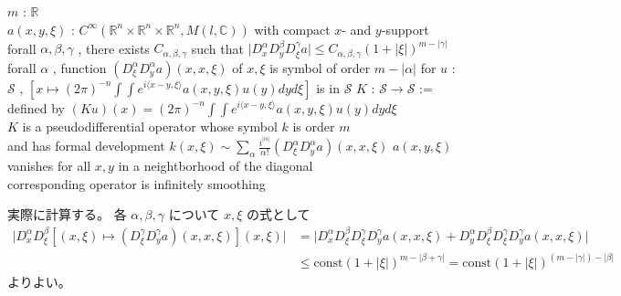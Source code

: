 \begin{Theorem}
\itemwhen
  \For \(m\) : \(\mathbb{R}\) \\
  \For \(a(x,y,\xi)\) : \(C^{\infty}(\mathbb{R}^n \times \mathbb{R}^n \times \mathbb{R}^n , M(l,\mathbb{C}))\) with compact \(x\)- and \(y\)-support \\
  \IfHold forall \(\alpha , \beta , \gamma\) , there exists \(C_{\alpha , \beta , \gamma}\) such that \(\lvert D^\alpha_x D^\beta_y D^\gamma_\xi a \rvert \leq C_{\alpha , \beta , \gamma} (1 + \lvert \xi \rvert)^{m - \lvert \gamma \rvert}\)
\itemprop
  \Then forall \(\alpha\) , function \((D^\alpha_\xi D^\alpha_y a)(x , x , \xi)\) of \(x,\xi\) is symbol of order \(m - \lvert \alpha \rvert\)
\itemprop
  \Then for \(u\) : \(\mathscr{S}\) , \(\left[x \mapsto (2\pi)^{-n} \int \int e^{i \langle x-y , \xi \rangle} a(x,y,\xi) u(y) dy d\xi \right]\) is in \(\mathscr{S}\)
\itemprop
  \Let \(K\) : \(\mathscr{S} \to \mathscr{S}\) := defined by \((Ku)(x) = (2\pi)^{-n} \int \int e^{i \langle x-y , \xi \rangle} a(x,y,\xi) u(y) dy d\xi\) \\
  \Then \(K\) is a pseudodifferential operator whose symbol \(k\) is order \(m\) \\
  \Then and has formal development \(k(x,\xi) \sim \sum_{\alpha} \frac{i ^ {\lvert \alpha \rvert}}{\alpha !} (D^\alpha_\xi D^\alpha_y a)(x , x , \xi)\)
\itemprop
  \IfHold \(a(x,y,\xi)\) vanishes for all \(x,y\) in a neightborhood of the diagonal \\
  \Then corresponding operator is infinitely smoothing
\end{Theorem}

\begin{Proof}
\itemprof
  実際に計算する。
  各 \(\alpha , \beta , \gamma\) について \(x,\xi\) の式として
  \begin{align*}
    \lvert D^\alpha_x D^\beta_\xi[(x,\xi) \mapsto (D^\gamma_\xi D^\gamma_y a)(x , x , \xi)](x,\xi) \rvert 
    &= \lvert D^\alpha_x D^\beta_\xi D^\gamma_\xi D^\gamma_y a (x , x , \xi)
      + D^\alpha_y D^\beta_\xi D^\gamma_\xi D^\gamma_y a (x , x , \xi) \rvert \\
    &\leq \text{const} (1 + \lvert \xi \rvert)^{m - \lvert \beta + \gamma \rvert}
    = \text{const} (1 + \lvert \xi \rvert)^{(m - \lvert \gamma \rvert) - \lvert \beta \rvert}
  \end{align*}
  よりよい。
\end{Proof}

